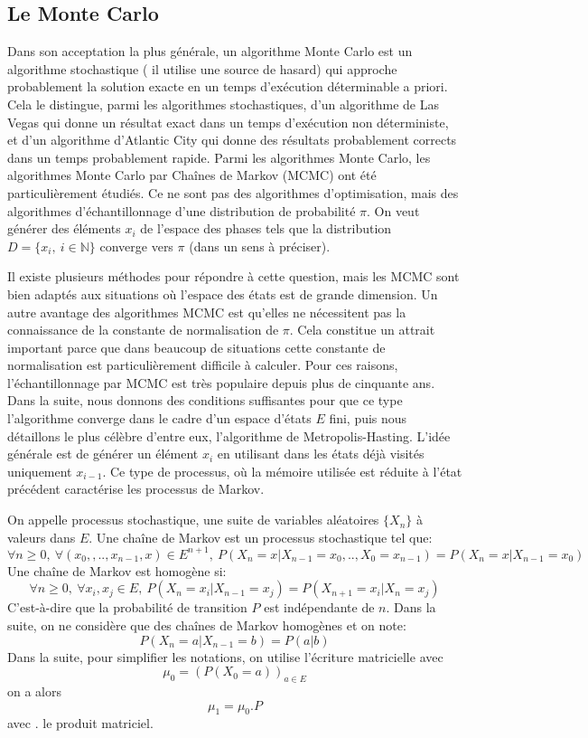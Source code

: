 \subsection{Le Monte Carlo}
\label{sub:MC}
Dans son acceptation la plus générale, un algorithme Monte Carlo est un algorithme stochastique ( il utilise une source de hasard) qui approche probablement la solution exacte en un temps d'exécution déterminable a priori. Cela le distingue, parmi les algorithmes stochastiques, d'un algorithme de Las Vegas qui donne un résultat exact dans un temps d'exécution non déterministe, et d'un algorithme d'Atlantic City qui donne des résultats probablement corrects dans un temps probablement rapide. Parmi les algorithmes Monte Carlo, les algorithmes Monte Carlo par Chaînes de Markov (MCMC) ont été particulièrement étudiés. Ce ne sont pas des algorithmes d'optimisation, mais des algorithmes d'échantillonnage d'une distribution de probabilité $\pi$. On veut générer des éléments $x_i$ de l'espace des phases tels que la distribution $D=\{x_i,\ i \in \mathbb{N} \}$ converge vers $\pi$ (dans un sens à préciser).

Il existe plusieurs méthodes pour répondre à cette question, mais les MCMC sont bien adaptés aux situations où l'espace des états est de grande dimension. Un autre avantage des algorithmes MCMC est qu'elles ne nécessitent pas la connaissance de la constante de normalisation de $\pi$. Cela constitue un attrait important parce que dans beaucoup de situations cette constante de normalisation est particulièrement difficile à calculer. Pour ces raisons, l'échantillonnage par MCMC est très populaire depuis plus de cinquante ans. Dans la suite, nous donnons des conditions suffisantes pour que ce type l'algorithme converge dans le cadre d'un espace d'états $E$ fini, puis nous détaillons le plus célèbre d'entre eux, l'algorithme de Metropolis-Hasting. L'idée générale est de générer un élément $x_i$ en utilisant dans les états déjà visités uniquement $x_{i-1}$. Ce type de processus, où la mémoire utilisée est réduite à l'état précédent caractérise les processus de Markov.


On appelle processus stochastique, une suite de variables aléatoires $\{X_n\}$ à valeurs dans $E$.
Une chaîne de Markov est un processus stochastique tel que:\\
\[ \forall n \geqslant 0 ,\ \forall (x_0,,..,x_{n-1},x) \in E^{n+1},\  P(X_n=x|X_{n-1}=x_0,..,X_{0}=x_{n-1}) = P(X_n=x|X_{n-1}=x_0) \]
Une chaîne de Markov est homogène si:
\begin{equation}
  \label{eq_homog}
\forall n \geqslant 0 ,\ \forall x_i,x_j \in E,\ P(X_n=x_i|X_{n-1}=x_j)= P(X_{n+1}=x_i|X_n=x_j) 
\end{equation}
C'est-à-dire que la probabilité de transition $P$ est indépendante de $n$. Dans la suite, on ne considère que des chaînes de Markov homogènes et on note:
\[P(X_n=a | X_{n-1}=b) = P(a|b)\]
Dans la suite, pour simplifier les notations, on utilise l'écriture matricielle avec
\[\mu_0 =(P(X_0=a))_{a \in E}\]
on a alors
\[\mu_1 =\mu_0 . P\] avec . le produit matriciel.

